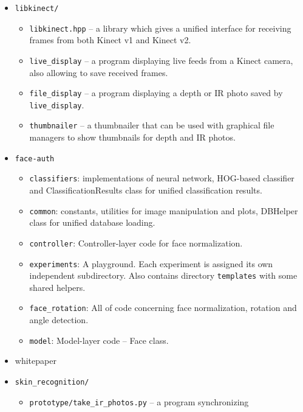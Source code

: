     \begin{itemize}
        \item \texttt{libkinect/}
        \begin{itemize}
            \item \texttt{libkinect.hpp} -- a library which gives a unified interface
            for receiving frames from both Kinect v1 and Kinect v2.
            \item \texttt{live\_display} -- a program displaying live feeds from a Kinect
            camera, also allowing to save received frames.
            \item \texttt{file\_display} -- a program displaying a depth or IR photo saved
            by \texttt{live\_display}.
            \item \texttt{thumbnailer} -- a thumbnailer that can be used with graphical
            file managers to show thumbnails for depth and IR photos.
        \end{itemize}
        \item \texttt{face-auth}
            \begin{itemize}
                \item \texttt{classifiers}: implementations of neural network,
                      HOG-based classifier and ClassificationResults class for
                      unified classification results.
                \item \texttt{common}: constants, utilities for image manipulation and plots,
                      DBHelper class for unified database loading.
                \item \texttt{controller}: Controller-layer code for face normalization.
                \item \texttt{experiments}: A playground. Each experiment is assigned its
                      own independent subdirectory. Also contains directory \texttt{templates}
                      with some shared helpers.
                \item \texttt{face\_rotation}: All of code concerning face normalization, rotation
                      and angle detection.
                \item \texttt{model}: Model-layer code -- Face class.
            \end{itemize}
        \item whitepaper
      \item \texttt{skin\_recognition/}
      \begin{itemize}
          \item \texttt{prototype/take\_ir\_photos.py} -- a program synchronizing

\end{itemize}
\end{itemize}
